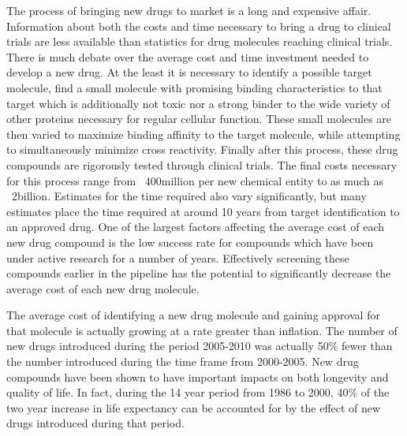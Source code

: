 The process of bringing new drugs to market is a long and expensive affair.
Information about both the costs and time necessary to bring a drug to clinical trials are less available than statistics for drug molecules reaching clinical trials.
There is much debate over the average cost and time investment needed to develop a new drug.
At the least it is necessary to identify a possible target molecule, find a small molecule with promising binding characteristics to that target which is additionally not toxic nor a strong binder to the wide variety of other proteins necessary for regular cellular function.
These small molecules are then varied to maximize binding affinity to the target molecule, while attempting to simultaneously minimize cross reactivity.
Finally after this process, these drug compounds are rigorously tested through clinical trials.
The final costs necessary for this process range from ~400million per new chemical entity to as much as ~2billion.
Estimates for the time required also vary significantly, but many estimates place the time required at around 10 years from target identification to an approved drug.
One of the largest factors affecting the average cost of each new drug compound is the low success rate for compounds which have been under active research for a number of years.
Effectively screening these compounds earlier in the pipeline has the potential to significantly decrease the average cost of each new drug molecule.
\cite{adams2006estimating}

The average cost of identifying a new drug molecule and gaining approval for that molecule is actually growing at a rate greater than inflation.
The number of new drugs introduced during the period 2005-2010 was actually 50\% fewer than the number introduced during the time frame from 2000-2005.
New drug compounds have been shown to have important impacts on both longevity and quality of life.
In fact, during the 14 year period from 1986 to 2000, 40\% of the two year increase in life expectancy can be accounted for by the effect of new drugs introduced during that period.
\cite{paul2010improve}

